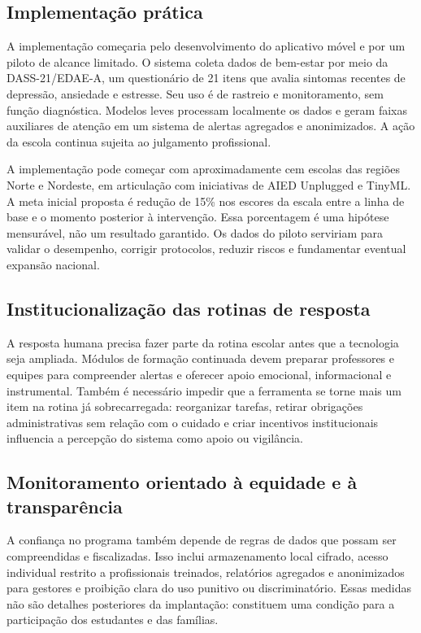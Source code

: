 \subsection{Implementação prática}

A implementação começaria pelo desenvolvimento do aplicativo móvel e por um
piloto de alcance limitado. O sistema coleta dados de bem-estar por meio da DASS-21/EDAE-A, um
questionário de 21 itens que avalia sintomas recentes de depressão, ansiedade e
estresse. Seu uso é de rastreio e monitoramento, sem função diagnóstica. Modelos
leves processam localmente os dados e geram faixas auxiliares de atenção em um
sistema de alertas agregados e anonimizados. A ação da escola continua sujeita
ao julgamento profissional.

A implementação pode começar com aproximadamente cem escolas das regiões Norte e
Nordeste, em articulação com iniciativas de AIED Unplugged e TinyML. A meta
inicial proposta é redução de 15\% nos escores da escala entre a linha de base e
o momento posterior à intervenção. Essa porcentagem é uma hipótese mensurável,
não um resultado garantido. Os dados do piloto serviriam para validar o
desempenho, corrigir protocolos, reduzir riscos e fundamentar eventual expansão
nacional.

\subsection{Institucionalização das rotinas de resposta}

A resposta humana precisa fazer parte da rotina escolar antes que a tecnologia
seja ampliada. Módulos de formação continuada devem preparar professores e equipes
para compreender alertas e oferecer apoio emocional, informacional e
instrumental. Também é necessário impedir que a ferramenta se torne mais um
item na rotina já sobrecarregada: reorganizar tarefas, retirar obrigações
administrativas sem relação com o cuidado e criar incentivos institucionais
influencia a percepção do sistema como apoio ou vigilância.

\subsection{Monitoramento orientado à equidade e à transparência}

A confiança no programa também depende de regras de dados que possam ser
compreendidas e fiscalizadas. Isso inclui armazenamento local cifrado, acesso individual
restrito a profissionais treinados, relatórios agregados e anonimizados para
gestores e proibição clara do uso punitivo ou discriminatório. Essas medidas não
são detalhes posteriores da implantação: constituem uma condição para a
participação dos estudantes e das famílias.

